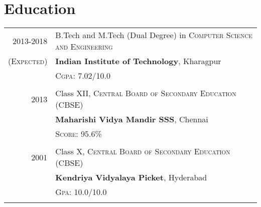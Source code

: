 \documentclass[a4paper,10pt]{article} %
\begin{document}

\section{Education}

\begin{tabular}{rl}	
2013-2018 & B.Tech and M.Tech (Dual Degree) in \textsc{Computer Science and Engineering}\\
\textsc{(Expected)}&\textbf{Indian Institute of Technology}, Kharagpur\\
&\normalsize \textsc{Cgpa}: 7.02/10.0\\
&\\


2013& Class XII, \textsc{}\textsc{Central Board of Secondary Education (CBSE)} \\
&\normalsize\textbf{Maharishi Vidya Mandir SSS}, Chennai\\
&\normalsize \textsc{Score}: 95.6\%\\
&\\


2001 & Class X, \textsc{}\textsc{Central Board of Secondary Education (CBSE)} \\
&\normalsize\textbf{Kendriya Vidyalaya Picket}, Hyderabad\\
& \textsc{Gpa}: 10.0/10.0\\
&\\

\end{tabular}
\end{document}
